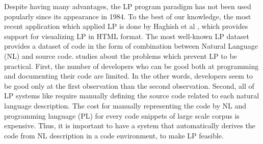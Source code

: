 Despite having many advantages, the LP program paradigm has not been used popularly since its appearance in 1984. To the best of our knowledge, the most recent application which applied LP is done by Haghish et al \cite{005}, which provides support for visualizing LP in HTML format. The most well-known LP dataset \cite{006} provides a dataset of code in the form of combination between Natural Language (NL) and source code. \cite{004} studies about the problems which prevent LP to be practical. First, the number of developers who can be good both at programming and documenting their code are limited. In the other words, developers seem to be good only at the first observation than the second observation. Second, all of LP systems like \cite{006} require manually defining the source code related to each natural language description. The cost for manually representing the code by NL and programming language (PL) for every code snippets of large scale corpus is expensive. Thus, it is important to have a system that automatically derives the code from NL description in a code environment, to make LP feasible.
\\
